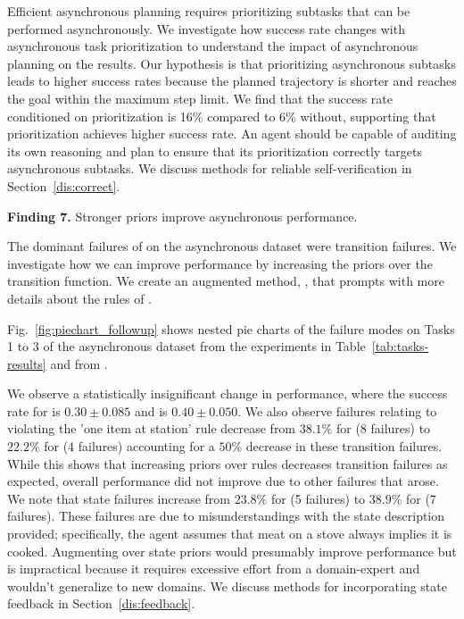 Efficient asynchronous planning requires prioritizing subtasks that can be performed asynchronously. We investigate how success rate changes with asynchronous task prioritization to understand the impact of asynchronous planning on the results. Our hypothesis is that prioritizing asynchronous subtasks leads to higher success rates because the planned trajectory is shorter and reaches the goal within the maximum step limit. We find that the success rate conditioned on prioritization is 16\% compared to 6\% without, supporting that prioritization achieves higher success rate. An agent should be capable of auditing its own reasoning and plan to ensure that its prioritization correctly targets asynchronous subtasks. We discuss methods for reliable self-verification in Section~\ref{dis:correct}.

\textbf{Finding 7.} Stronger priors improve asynchronous performance.

The dominant failures of \gptfo{} \react{} on the asynchronous dataset were transition failures. We investigate how we can improve performance by increasing the priors over the transition function. We create an augmented method, \reactp{}, that prompts \react{} with more details about the rules of \robotouille{}. 


Fig.~\ref{fig:piechart_followup} shows nested pie charts of the failure modes on Tasks 1 to 3 of the asynchronous dataset from the \gptfo{} \react{} experiments in Table~\ref{tab:tasks-results} and from \gptfo{} \reactp{}.

We observe a statistically insignificant change in performance, where the success rate for \gptfo{} \react{} is $0.30 \pm 0.085$ and \gptfo{} \reactp{} is $0.40 \pm 0.050$. We also observe failures relating to violating the 'one item at station' rule decrease from $38.1\%$ for \gptfo{} \react{} (8 failures) to $22.2\%$ for \gptfo{} \reactp{} (4 failures) accounting for a $50\%$ decrease in these transition failures. While this shows that increasing priors over rules decreases transition failures as expected, overall performance did not improve due to other failures that arose. We note that state failures increase from $23.8\%$ for \gptfo{} \react{} (5 failures) to $38.9\%$ for \gptfo{} \reactp{} (7 failures). These failures are due to misunderstandings with the state description provided; specifically, the agent assumes that meat on a stove always implies it is cooked. Augmenting \reactp{} over state priors would presumably improve performance but is impractical because it requires excessive effort from a domain-expert and wouldn't generalize to new domains. We discuss methods for incorporating state feedback in Section~\ref{dis:feedback}.

